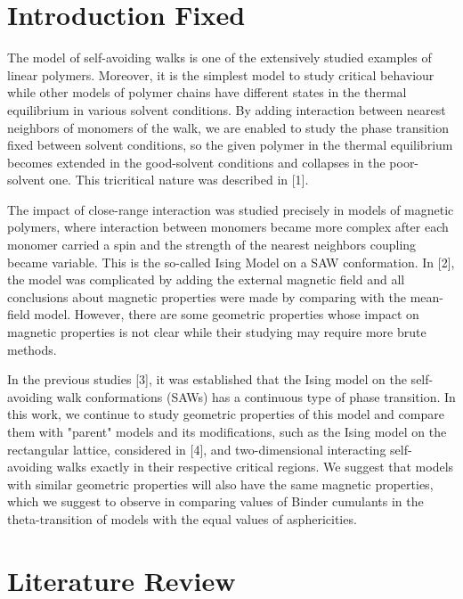 \documentclass[a4paper]{jpconf}
\begin{document}
\section{Introduction Fixed}

The model of self-avoiding walks is one of the extensively studied examples of linear polymers. 
Moreover, it is the simplest model to study critical behaviour while other models of polymer chains have different states in the thermal equilibrium in various solvent conditions. 
By adding interaction between nearest neighbors of monomers of the walk, we are enabled to study the phase transition fixed between solvent conditions, so the given polymer in the thermal equilibrium becomes extended in the good-solvent conditions and collapses in the poor-solvent one. 
This tricritical nature was described in [1].

The impact of close-range interaction was studied precisely in models of magnetic polymers, where interaction between monomers became more complex after each monomer carried a spin and the strength of the nearest neighbors coupling became variable. 
This is the so-called Ising Model on a SAW conformation. 
In [2], the model was complicated by adding the external magnetic field and all conclusions about magnetic properties were made by comparing with the mean-field model. 
However, there are some geometric properties whose impact on magnetic properties is not clear while their studying may require more brute methods.

In the previous studies [3], it was established that the Ising model on the self-avoiding walk conformations (SAWs) has a continuous type of phase transition. 
In this work, we continue to study geometric properties of this model and compare them with "parent" models and its modifications, such as the Ising model on the rectangular lattice, considered in [4], and two-dimensional interacting self-avoiding walks exactly in their respective critical regions. 
We suggest that models with similar geometric properties will also have the same magnetic properties, which we suggest to observe in comparing values of Binder cumulants in the theta-transition of models with the equal values of asphericities.


\section{Literature Review}
\end{document}
